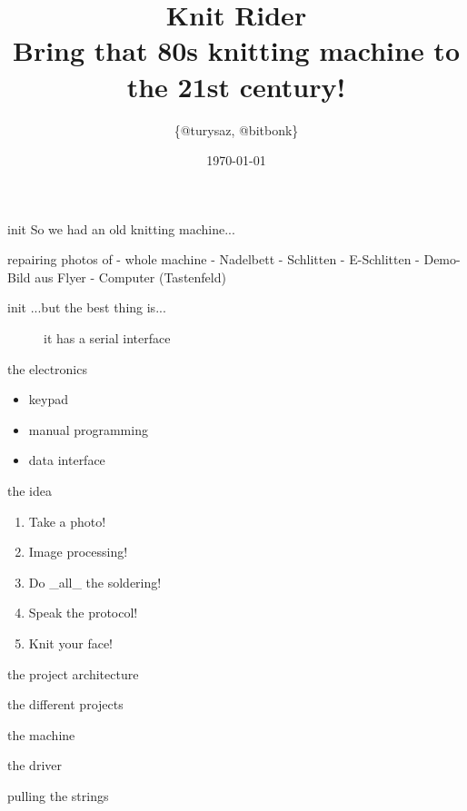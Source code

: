 \documentclass{beamer}
\author{\{@turysaz, @bitbonk\}}
\title{\Huge{Knit Rider}\\
    \large{Bring that 80s knitting machine to the 21st century!}
}
\date{\today{}}
\begin{document}
\maketitle

\begin{frame}{init}
      So we had an old knitting machine...
\end{frame}

\begin{frame}{repairing}
photos of
- whole machine
- Nadelbett
- Schlitten
- E-Schlitten
- Demo-Bild aus Flyer
- Computer (Tastenfeld)
\end{frame}

\begin{frame}{init}
    ...but the best thing is...\pause
    \begin{figure}
        \caption{it has a serial interface }
    \end{figure}
\end{frame}

\begin{frame}{the electronics}
    \begin{itemize}
        \item keypad
        \item manual programming
        \item data interface
    \end{itemize}
\end{frame}

\begin{frame}{the idea}
    \begin{enumerate}[<+->]
        \item Take a photo!
        \item Image processing!
        \item Do \_all\_ the soldering!
        \item Speak the protocol!
        \item Knit your face!
    \end{enumerate}
\end{frame}

\begin{frame}{the project architecture}
    \begin{figure}
    \end{figure}
\end{frame}

\begin{frame}{the different projects}
    \begin{description}[<+->]
        \item [knitt] the machine
        \item [michael] the driver
        \item [devon] pulling the strings
    \end{description}
\end{frame}
\end{document}
